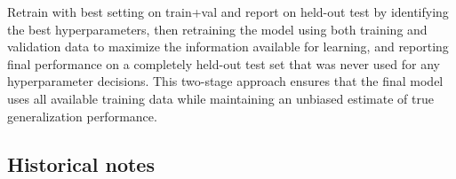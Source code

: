 Retrain with best setting on train+val and report on held-out test by identifying the best hyperparameters, then retraining the model using both training and validation data to maximize the information available for learning, and reporting final performance on a completely held-out test set that was never used for any hyperparameter decisions. This two-stage approach ensures that the final model uses all available training data while maintaining an unbiased estimate of true generalization performance.




\subsection{Historical notes}

